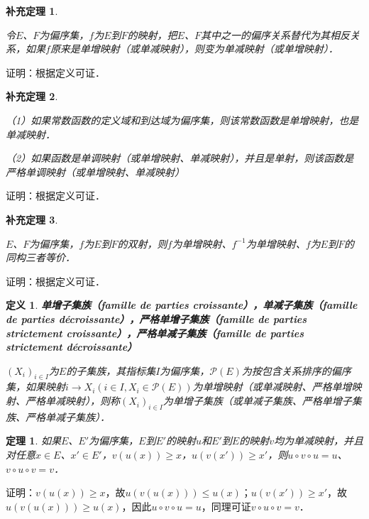 \documentclass[12pt, a4paper, oneside]{book}
\newtheorem{theo}{定理}
\newtheorem{cor}{补充定理}
\newtheorem{de}{定义}
\begin{document}
			\begin{cor}\label{cor164}
				\hfill\par
				令$E$、$F$为偏序集，$f$为$E$到$F$的映射，把$E$、$F$其中之一的偏序关系替代为其相反关系，如果$f$原来是单增映射（或单减映射），则变为单减映射（或单增映射）．
			\end{cor}
			证明：根据定义可证．
			
			\begin{cor}\label{cor165}
				\hfill\par
				（1）如果常数函数的定义域和到达域为偏序集，则该常数函数是单增映射，也是单减映射．
				\par
				（2）如果函数是单调映射（或单增映射、单减映射），并且是单射，则该函数是严格单调映射（或单增映射、单减映射）
			\end{cor}
			证明：根据定义可证．
			
			\begin{cor}\label{cor166}
				\hfill\par
				$E$、$F$为偏序集，$f$为$E$到$F$的双射，则$f$为单增映射、$f^{-1}$为单增映射、$f$为$E$到$F$的同构三者等价．
			\end{cor}
			证明：根据定义可证．
		
			\begin{de}
				\textbf{单增子集族（famille de parties croissante），单减子集族（famille de parties décroissante），严格单增子集族（famille de parties strictement croissante），严格单减子集族（famille de parties strictement décroissante）}
				\par
				$(X_i)_{i\in I}$为$E$的子集族，其指标集$I$为偏序集，$\mathcal{P}(E)$为按包含关系排序的偏序集，如果映射$i\to X_i(i\in I, X_i\in \mathcal{P}(E))$为单增映射（或单减映射、严格单增映射、严格单减映射），则称$(X_i)_{i\in I}$为单增子集族（或单减子集族、严格单增子集族、严格单减子集族）．
			\end{de}

			\begin{theo}
				\hfill\par
				如果$E$、$E'$为偏序集，$E$到$E'$的映射$u$和$E'$到$E$的映射$v$均为单减映射，并且对任意$x\in E$、$x'\in E'$，$v(u(x))\geq x$，$u(v(x'))\geq x'$，则$u\circ v\circ u=u$、$v\circ u\circ v=v$．
			\end{theo}
			证明：$v(u(x))\geq x$，故$u(v(u(x)))\leq u(x)；u(v(x'))\geq x'$，故$u(v(u(x)))\geq u(x)$，因此$u\circ v\circ u=u$，同理可证$v\circ u\circ v=v$．
			
\end{document}
